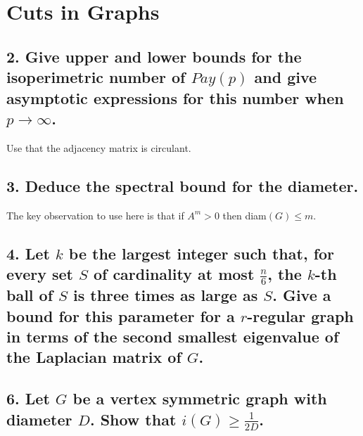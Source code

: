 \section{Cuts in Graphs}

\subsection[Cuts - 2]{2. Give upper and lower bounds for the isoperimetric number of $Pay(p)$ and give asymptotic expressions for this number when $p \rightarrow \infty$.}

Use that the adjacency matrix is circulant.

\subsection[Cuts - 3]{3. Deduce the spectral bound for the diameter.}

The key observation to use here is that if $A^m > 0$ then diam$(G) \leq m$.

\subsection[Cuts - 4]{4. Let $k$ be the largest integer such that, for every set $S$ of cardinality at most $\frac{n}{6}$, the $k$-th ball of $S$ is three times as large as $S$. Give a bound for this parameter for a $r$-regular graph in terms of the second smallest eigenvalue of the Laplacian matrix of $G$.}

\subsection[Cuts - 6]{6. Let $G$ be a vertex symmetric graph with diameter $D$. Show that $i(G) \geq \frac{1}{2D}$.}
